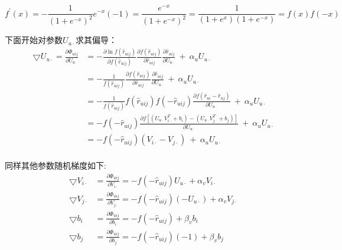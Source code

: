 \begin{equation*}
f^{'}(x) = -\frac{1}{\left(1+e^{-x}\right)^2} e^{-x}\left(-1\right) = \frac{e^{-x}}{\left(1+e^{-x}\right)^2} = \frac{1}{\left(1+e^{x}\right)\left(1+e^{-x}\right)} = {f(x)f(-x)}
\end{equation*}

下面开始对参数$U_{u\cdot}$求其偏导：
\begin{equation}
\begin{aligned}
\bigtriangledown U_{u\cdot} 
= \frac{\partial \Phi_{uij}}{\partial U_{u\cdot}}
&=-\frac{\partial \ln f\left(\hat{r}_{uij}\right)}{\partial f\left(\hat{r}_{uij}\right)} 
\frac{\partial f\left(\hat{r}_{uij}\right) }{\partial \hat{r}_{uij}} 
\frac{\partial \hat{r}_{uij}}{\partial U_{u\cdot}}
\ + \  \alpha_uU_{u\cdot}\\
&= -\frac{1}{f\left(\hat{r}_{uij}\right)} 
\frac{\partial f\left(\hat{r}_{uij}\right) }{\partial \hat{r}_{uij}} 
\frac{\partial \hat{r}_{uij}}{\partial U_{u\cdot}}
\ + \  \alpha_uU_{u\cdot}\\
&= -\frac{1}{f\left(\hat{r}_{uij}\right)} 
{f\left(\hat{r}_{uij}\right) f\left(-\hat{r}_{uij}\right)}
\frac{\partial f\left(\hat{r}_{ui} - \hat{r}_{uj}\right) }{\partial U_{u\cdot}} 
\ + \ \alpha_uU_{u\cdot}\\
&= -{f\left(-\hat{r}_{uij}\right)} \frac{\partial f\left[\left(U_{u\cdot}V_{i\cdot}^T+b_i\right) - \left(U_{u\cdot}V_{j\cdot}^T+b_j\right)\right] }{\partial U_{u\cdot}} 
\ + \ \alpha_uU_{u\cdot}\\
&= -{f\left(-\hat{r}_{uij}\right)} \left(V_{i\cdot} - V_{j\cdot}\right)  
\ + \  \alpha_uU_{u\cdot}\\
\end{aligned}
\end{equation}

同样其他参数随机梯度如下:
\begin{align} %
\bigtriangledown V_{i\cdot} &= \frac{\partial \Phi_{uij}}{\partial V_{i\cdot}}=-f\left(-\hat{r}_{uij}\right)U_{u\cdot} + \alpha_vV_{i\cdot}\\
\bigtriangledown V_{j\cdot} &= \frac{\partial \Phi_{uij}}{\partial V_{j\cdot}}=-f\left(-\hat{r}_{uij}\right)\left(-U_{u\cdot}\right) + \alpha_vV_{j\cdot}\\
\bigtriangledown b_i        &= \frac{\partial \Phi_{uij}}{\partial b_i} =-f\left(-\hat{r}_{uij}\right)+\beta_vb_i\\
\bigtriangledown b_j        &= \frac{\partial \Phi_{uij}}{\partial b_j} =-f\left(-\hat{r}_{uij}\right)\left(-1\right)+\beta_vb_j
\end{align}

